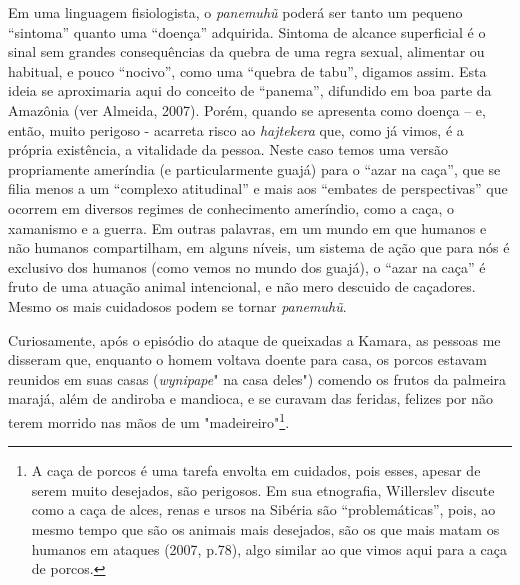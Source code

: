Em uma linguagem fisiologista, o \emph{panemuhũ} poderá ser tanto um
pequeno ``sintoma'' quanto uma ``doença'' adquirida. Sintoma de alcance
superficial é o sinal sem grandes consequências da quebra de uma regra
sexual, alimentar ou habitual, e pouco ``nocivo'', como uma ``quebra de
tabu'', digamos assim. Esta ideia se aproximaria aqui do conceito de
``panema'', difundido em boa parte da Amazônia (ver Almeida, 2007).
Porém, quando se apresenta como doença -- e, então, muito perigoso -
acarreta risco ao \emph{hajtekera} que, como já vimos, é a própria
existência, a vitalidade da pessoa. Neste caso temos uma versão
propriamente ameríndia (e particularmente guajá) para o ``azar na
caça'', que se filia menos a um ``complexo atitudinal'' e mais aos
``embates de perspectivas'' que ocorrem em diversos regimes de
conhecimento ameríndio, como a caça, o xamanismo e a guerra. Em outras
palavras, em um mundo em que humanos e não humanos compartilham, em
alguns níveis, um sistema de ação que para nós é exclusivo dos humanos
(como vemos no mundo dos guajá), o ``azar na caça'' é fruto de uma
atuação animal intencional, e não mero descuido de caçadores. Mesmo os
mais cuidadosos podem se tornar \emph{panemuhũ}.

Curiosamente, após o episódio do ataque de queixadas a Kamara, as
pessoas me disseram que, enquanto o homem voltava doente para casa, os
porcos estavam reunidos em suas casas (\emph{wynipape}" na casa deles")
comendo os frutos da palmeira marajá, além de andiroba e mandioca, e se
curavam das feridas, felizes por não terem morrido nas mãos de um
"madeireiro"\footnote{A caça de porcos é uma tarefa envolta em cuidados,
  pois esses, apesar de serem muito desejados, são perigosos. Em sua
  etnografia, Willerslev discute como a caça de alces, renas e ursos na
  Sibéria são ``problemáticas'', pois, ao mesmo tempo que são os animais
  mais desejados, são os que mais matam os humanos em ataques (2007,
  p.78), algo similar ao que vimos aqui para a caça de porcos.}.
